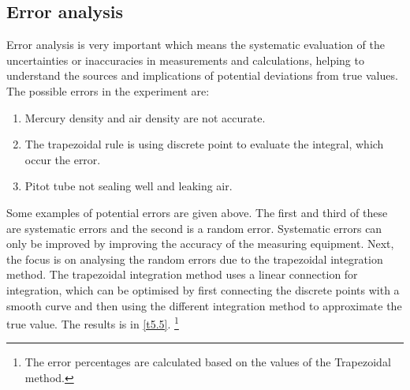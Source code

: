 \subsection*{Error analysis}
Error analysis is very important which means the systematic evaluation of the uncertainties or inaccuracies in measurements and calculations, helping to understand the sources and implications of potential deviations from true values.
The possible errors in the experiment are:
\begin{enumerate}
    \item Mercury density and air density are not accurate.
    \item The trapezoidal rule is using discrete point to evaluate the integral, which occur the error.
    \item Pitot tube not sealing well and leaking air.
\end{enumerate}
Some examples of potential errors are given above. The first and third of these are systematic errors and the second is a random error.
Systematic errors can only be improved by improving the accuracy of the measuring equipment. Next, the focus is on analysing the random errors due to the trapezoidal integration method.
The trapezoidal integration method uses a linear connection for integration, which can be optimised by first connecting the discrete points with a smooth curve and then using the different integration method to approximate the true value. The results is in \autoref{t5.5}.    \footnote{The error percentages are calculated based on the values of the Trapezoidal method.}

\begin{table}[htbp]
    \caption{Different integration method to calculate $C_L$}  
    \label{t5.5}
    \centering
    \end{table}